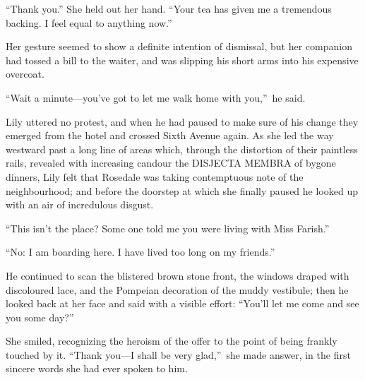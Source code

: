\documentclass[12pt,a4paper]{book}
\begin{document}
``Thank you.'' She held out her hand. ``Your tea has given me a
tremendous backing. I feel equal to anything now.''





Her gesture seemed to show a definite intention of dismissal, but
her companion had tossed a bill to the waiter, and was slipping
his short arms into his expensive overcoat.





``Wait a minute---you've got to let me walk home with you,''\ he
said.





Lily uttered no protest, and when he had paused to make sure of
his change they emerged from the hotel and crossed Sixth Avenue
again. As she led the way westward past a long line of areas
which, through the distortion of their paintless rails, revealed
with increasing candour the DISJECTA MEMBRA of bygone dinners,
Lily felt that Rosedale was taking contemptuous note of the
neighbourhood; and before the doorstep at which she finally
paused he looked up with an air of incredulous disgust.





``This isn't the place? Some one told me you were living with Miss
Farish.''





``No: I am boarding here. I have lived too long on my friends.''





He continued to scan the blistered brown stone front, the windows
draped with discoloured lace, and the Pompeian decoration of the
muddy vestibule; then he looked back at her face and said with a
visible effort: ``You'll let me come and see you some day?''





She smiled, recognizing the heroism of the offer to the point of
being frankly touched by it. ``Thank you---I shall be very
glad,''\ she made answer, in the first sincere words she had ever
spoken to him.
\end{document}
